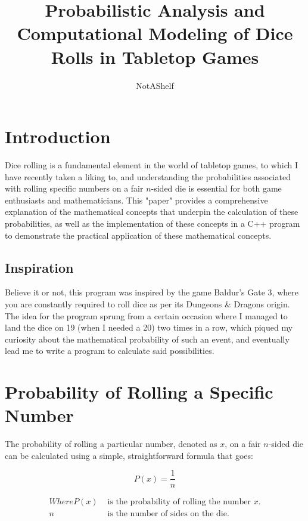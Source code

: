 \documentclass{article}
\title{Probabilistic Analysis and Computational Modeling of Dice Rolls in Tabletop Games}
\author{NotAShelf}
\begin{document}
\maketitle

\tableofcontents

\section{Introduction}

Dice rolling is a fundamental element in the world of tabletop games, to which I have recently taken a liking to, and
understanding the probabilities associated with rolling specific numbers on a fair $n$-sided die is essential
for both game enthusiasts and mathematicians. This "paper" provides a comprehensive explanation of the
mathematical concepts that underpin the calculation of these probabilities, as well as the implementation of
these concepts in a C++ program to demonstrate the practical application of these mathematical concepts.

\subsection{Inspiration}

Believe it or not, this program was inspired by the game Baldur's Gate 3, where you are constantly required to
roll dice as per its Dungeons \& Dragons origin. The idea for the program sprung from a certain occasion
where I managed to land the dice on 19 (when I needed a 20) two times in a row, which piqued my curiosity about the
mathematical probability of such an event, and eventually lead me to write a program to calculate said possibilities.

\section{Probability of Rolling a Specific Number}

The probability of rolling a particular number, denoted as $x$, on a fair $n$-sided die can be calculated
using a simple, straightforward formula that goes:

\[
P(x) = \frac{1}{n}
\]

\begin{align*}
Where P(x) & \text{ is the probability of rolling the number } x. \\
n & \text{ is the number of sides on the die.}
\end{align*}
\end{document}
